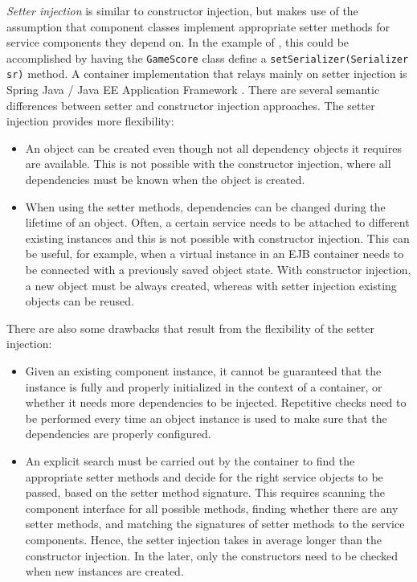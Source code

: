 \begin{dinglist}{43}
\item \textit{Setter injection} is similar to constructor injection, but makes use of the assumption that component classes implement appropriate setter methods for service components they depend on. In the example of , this could be accomplished by having the \texttt{Ga\-me\-Sco\-re} class define a \texttt{setSe\-riali\-zer(Se\-ria\-li\-zer sr)} method. A container implementation that relays mainly on setter injection is Spring Java / Java EE Application Framework \cite{www.spring}. There are several semantic differences between setter and constructor injection approaches. The setter injection provides more flexibility:
\begin{itemize}
\item An object can be created even though not all dependency objects it requires are available. This is not possible with the constructor injection, where all dependencies must be known when the object is created.
\item When using the setter methods, dependencies can be changed during the lifetime of an object. Often, a certain service needs to be attached to different existing instances and this is not possible with constructor injection. This can be useful, for example, when a virtual instance \cite{server.patterns.02} in an EJB container needs to be connected with a previously saved object state. With constructor injection, a new object must be always created, whereas with setter injection existing objects can be reused.
\end{itemize}
There are also some drawbacks that result from the flexibility of the setter injection:
\begin{itemize}
\item Given an existing component instance, it cannot be guaranteed that the instance is fully and properly initialized in the context of a container, or whether it needs more dependencies to be injected. Repetitive checks need to be performed every time an object instance is used to make sure that the dependencies are properly configured.

\item An explicit search must be carried out by the container to find the appropriate setter methods and decide for the right service objects to be passed, based on the setter method signature. This requires scanning the component interface for all possible methods, finding whether there are any setter methods, and matching the signatures of setter methods to the service components. Hence, the setter injection takes in average longer than the constructor injection. In the later, only the constructors need to be checked when new instances are created.
\end{itemize}


\end{dinglist}
